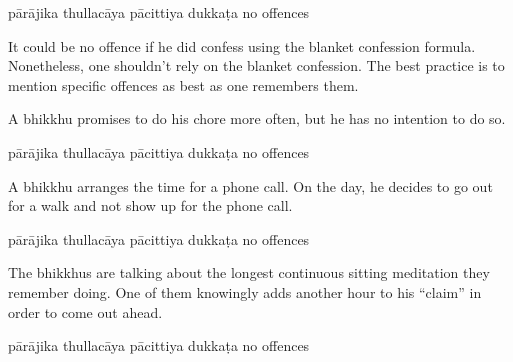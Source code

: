 \begin{exam}{\autoExamName}
\begin{problem*}
\begin{parts}
  \bigskip

  \begin{answers}{5}
    \bChoices
     pārājika\eAns
     thullacāya\eAns
     pācittiya\eAns
     dukkaṭa\eAns
     no offences\eAns
    \eChoices
  \end{answers}

  \begin{solution}
    It could be no offence if he did confess using the blanket confession
    formula. Nonetheless, one shouldn't rely on the blanket confession. The best
    practice is to mention specific offences as best as one remembers them.
  \end{solution}

  \bigskip

\item A bhikkhu promises to do his chore more often, but he has no intention to
  do so.

  \bigskip

  \begin{answers}{5}
    \bChoices
     pārājika\eAns
     thullacāya\eAns
     pācittiya\eAns
     dukkaṭa\eAns
     no offences\eAns
    \eChoices
  \end{answers}

  \bigskip

\item A bhikkhu arranges the time for a phone call. On the day, he decides to go
  out for a walk and not show up for the phone call.

  \bigskip

  \begin{answers}{5}
    \bChoices
     pārājika\eAns
     thullacāya\eAns
     pācittiya\eAns
     dukkaṭa\eAns
     no offences\eAns
    \eChoices
  \end{answers}

  \bigskip

\item The bhikkhus are talking about the longest continuous sitting meditation
  they remember doing. One of them knowingly adds another hour to his ``claim''
  in order to come out ahead.

  \bigskip

  \begin{answers}{5}
    \bChoices
     pārājika\eAns
     thullacāya\eAns
     pācittiya\eAns
     dukkaṭa\eAns
     no offences\eAns
    \eChoices
  \end{answers}


\end{parts}
\end{problem*}
\end{exam}
